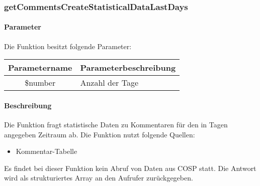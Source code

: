 \subsubsection{getCommentsCreateStatisticalDataLastDays}
\paragraph{Parameter} Die Funktion besitzt folgende Parameter:
\begin{table}[H]
	\begin{tabular}{|c|p{11cm}|}
		\hline
		\textbf{Parametername} & \textbf{Parameterbeschreibung} \\ \hline
		\$number & Anzahl der Tage \\ \hline
	\end{tabular}
\end{table}
\paragraph{Beschreibung} Die Funktion fragt statistische Daten  zu Kommentaren für den in Tagen angegeben Zeitraum ab. Die Funktion nutzt folgende Quellen:
\begin{itemize}
	\item Kommentar-Tabelle
\end{itemize}
Es findet bei dieser Funktion kein Abruf von Daten aus {\glqq COSP\grqq} statt. Die Antwort wird als strukturiertes Array an den Aufrufer zurückgegeben.
